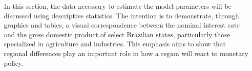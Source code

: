 \documentclass[
thesis.tex
]{subfiles}
\begin{document}
	

In this section, the data necessary to estimate the model parameters will be discussed using descriptive statistics. The intention is to demonstrate, through graphics and tables, a visual correspondence between the nominal interest rate and the gross domestic product of select Brazilian states, particularly those specialized in agriculture and industries. This emphasis aims to show that regional differences play an important role in how a region will react to monetary policy. 
\end{document}
